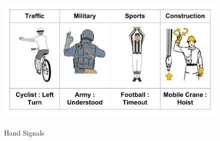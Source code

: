 \begin{figure}
	[h] \centering 
	\includegraphics[height=7cm]{figures/content/ges-signals.png} \caption{Hand Signals} \label{fg:ges:signal} 
\end{figure}
